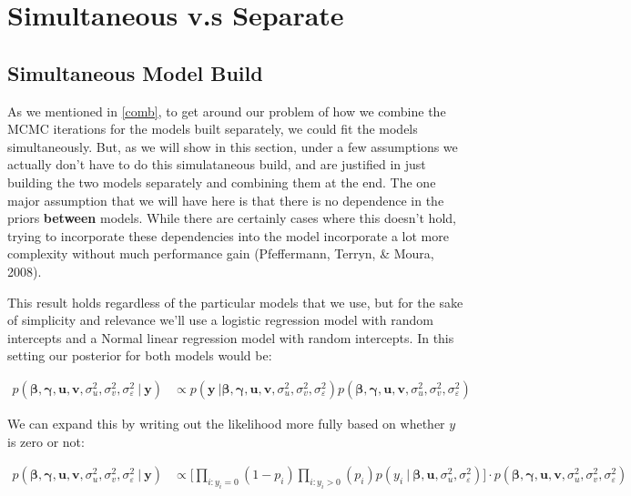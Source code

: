 \documentclass[12pt,twoside]{reedthesis}
\begin{document}
\hypertarget{sepsim}{%
\chapter{Simultaneous v.s Separate}\label{sepsim}}

\hypertarget{simultaneous-model-build}{%
\section{Simultaneous Model Build}\label{simultaneous-model-build}}

As we mentioned in \ref{comb}, to get around our problem of how we combine the MCMC iterations for the models built separately, we could fit the models simultaneously. But, as we will show in this section, under a few assumptions we actually don't have to do this simulataneous build, and are justified in just building the two models separately and combining them at the end. The one major assumption that we will have here is that there is no dependence in the priors \textbf{between} models. While there are certainly cases where this doesn't hold, trying to incorporate these dependencies into the model incorporate a lot more complexity without much performance gain (Pfeffermann, Terryn, \& Moura, 2008).

This result holds regardless of the particular models that we use, but for the sake of simplicity and relevance we'll use a logistic regression model with random intercepts and a Normal linear regression model with random intercepts. In this setting our posterior for both models would be:

\[
\begin{aligned}
p(\boldsymbol{\beta}, \boldsymbol{\gamma}, \mathbf{u}, \mathbf{v}, \sigma_u^2, \sigma_v^2, \sigma_{\varepsilon}^2\ | \ \mathbf{y}) &\propto p(\mathbf{y} \ | \boldsymbol{\beta}, \boldsymbol{\gamma}, \mathbf{u}, \mathbf{v}, \sigma_u^2, \sigma_v^2, \sigma_{\varepsilon}^2)p(\boldsymbol{\beta}, \boldsymbol{\gamma}, \mathbf{u}, \mathbf{v}, \sigma_u^2, \sigma_v^2, \sigma_{\varepsilon}^2) 
\end{aligned}
\]

We can expand this by writing out the likelihood more fully based on whether \(y\) is zero or not:

\[
\begin{aligned}
p(\boldsymbol{\beta}, \boldsymbol{\gamma}, \mathbf{u}, \mathbf{v}, \sigma_u^2, \sigma_v^2, \sigma_{\varepsilon}^2 \ | \ \mathbf{y}) & \propto \bigg[\prod_{i:y_i = 0}(1-p_i)\prod_{i:y_i > 0}(p_i)p(y_i \ | \ \boldsymbol{\beta}, \mathbf{u}, \sigma_u^2, \sigma_{\varepsilon}^2)\bigg]\cdot  p(\boldsymbol{\beta}, \boldsymbol{\gamma}, \mathbf{u}, \mathbf{v}, \sigma_u^2, \sigma_v^2, \sigma_{\varepsilon}^2)\\
\end{aligned}
\]
\end{document}
